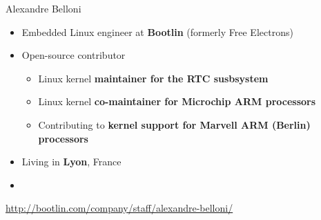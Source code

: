 \begin{frame}{Alexandre Belloni}
    \begin{itemize}
      \item Embedded Linux engineer at {\bf Bootlin} (formerly Free
            Electrons)
      \item Open-source contributor
        \begin{itemize}
          \item Linux kernel {\bf maintainer for the RTC susbsystem}
          \item Linux kernel {\bf co-maintainer for Microchip ARM
            processors}
          \item Contributing to {\bf kernel support for Marvell
            ARM (Berlin) processors}
        \end{itemize}
      \item Living in {\bf Lyon}, France
      \item {}
    \end{itemize}
    {\small \url{http://bootlin.com/company/staff/alexandre-belloni/}}
\end{frame}

